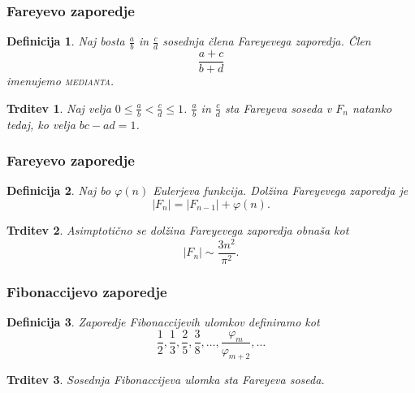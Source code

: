 \documentclass{beamer}
\newtheorem{definicija}{Definicija}
\newtheorem{trditev}{Trditev}
\newcommand{\pojem}[1]{\textsc{#1}}
\begin{document}

\begin{frame}
\frametitle{Fareyevo zaporedje}

\begin{definicija}
Naj bosta $\frac{a}{b}$ in $\frac{c}{d}$ sosednja člena Fareyevega zaporedja. Člen \[\frac{a+c}{b+d} \] imenujemo \pojem{medianta}.
\end{definicija}

\pause
\begin{trditev}
Naj velja \( 0 \leq \frac{a}{b} < \frac{c}{d} \leq 1\). $\frac{a}{b}$ in $\frac{c}{d}$ sta Fareyeva soseda v $F_n$ natanko tedaj, ko velja \(bc - ad = 1\).
\end{trditev}

\end{frame}


\begin{frame}
\frametitle{Fareyevo zaporedje}

\begin{definicija}
Naj bo $\varphi(n)$ Eulerjeva funkcija. Dolžina Fareyevega zaporedja je
\[  |F_{n}| = |F_{n-1}| + \varphi(n). \]
\end{definicija}

\pause
\begin{trditev}
Asimptotično se dolžina Fareyevega zaporedja obnaša kot
\[  |F_{n}|\sim\frac{3n^2}{\pi^2}. \]
\end{trditev}

\end{frame}


\begin{frame}
\frametitle{Fibonaccijevo zaporedje}

\begin{definicija}
Zaporedje Fibonaccijevih ulomkov definiramo kot
\[ \frac{1}{2}, \frac{1}{3}, \frac{2}{5}, \frac{3}{8}, \dots , \frac{\varphi_m}{\varphi_{m+2}}, \dots \]
\end{definicija}

\pause
\begin{trditev}
Sosednja Fibonaccijeva ulomka sta Fareyeva soseda.
\end{trditev}

\end{frame}

\end{document}

